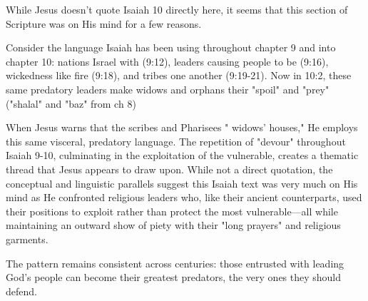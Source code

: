 \documentclass[11pt]{article}
\begin{document}
\vspace{1em}

While Jesus doesn't quote Isaiah 10 directly here, it seems that this section of Scripture was on His mind for a few reasons.

Consider the language Isaiah has been using throughout chapter 9 and into chapter 10: nations  Israel with  (9:12), leaders causing people to be  (9:16), wickedness  like fire (9:18), and tribes  one another (9:19-21). Now in 10:2, these same predatory leaders make widows and orphans their "spoil" and "prey" ("shalal" and "baz" from ch 8)

When Jesus warns that the scribes and Pharisees " widows' houses," He employs this same visceral, predatory language. The repetition of "devour" throughout Isaiah 9-10, culminating in the exploitation of the vulnerable, creates a thematic thread that Jesus appears to draw upon. While not a direct quotation, the conceptual and linguistic parallels suggest this Isaiah text was very much on His mind as He confronted religious leaders who, like their ancient counterparts, used their positions to exploit rather than protect the most vulnerable—all while maintaining an outward show of piety with their "long prayers" and religious garments.

The pattern remains consistent across centuries: those entrusted with leading God's people can become their greatest predators,  the very ones they should defend.
\end{document}
